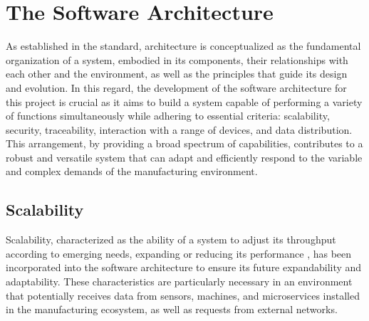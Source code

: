 \section{The Software Architecture}\label{section:softwareArchitecture}

As established in the \textcite{ieee} standard, architecture is conceptualized as the fundamental organization of a system, embodied in its components, their relationships with each other and the environment, as well as the principles that guide its design and evolution. In this regard, the development of the software architecture for this project is crucial as it aims to build a system capable of performing a variety of functions simultaneously while adhering to essential criteria: scalability, security, traceability, interaction with a range of devices, and data distribution. This arrangement, by providing a broad spectrum of capabilities, contributes to a robust and versatile system that can adapt and efficiently respond to the variable and complex demands of the manufacturing environment.

\subsection{Scalability}\label{section:softwareArchitecture-scalability}
Scalability, characterized as the ability of a system to adjust its throughput according to emerging needs, expanding or reducing its performance \cite{garland2003large}, has been incorporated into the software architecture to ensure its future expandability and adaptability. These characteristics are particularly necessary in an environment that potentially receives data from sensors, machines, and microservices installed in the manufacturing ecosystem, as well as requests from external networks.

